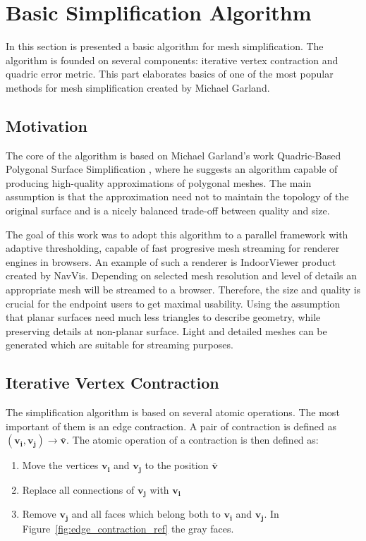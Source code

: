 \chapter{Basic Simplification Algorithm}
\thispagestyle{empty}%
In this section is presented a basic algorithm for mesh simplification. The algorithm is founded on several components: iterative vertex contraction and quadric error metric. This part elaborates basics of one of the most popular methods for mesh simplification created by Michael Garland.
\section{Motivation}
The core of the algorithm is based on Michael Garland's work Quadric-Based Polygonal Surface Simplification \cite{garland99}, where he suggests an algorithm capable of producing high-quality approximations of polygonal meshes. The main assumption is that the approximation need not to maintain the topology of the original surface and is a nicely balanced trade-off between quality and size.

The goal of this work was to adopt this algorithm to a parallel framework with adaptive thresholding, capable of fast progresive mesh streaming \cite{yang01} for renderer engines in browsers. An example of such a renderer is IndoorViewer product created by NavVis. Depending on selected mesh resolution and level of details an appropriate mesh will be streamed to a browser. Therefore, the size and quality is crucial for the endpoint users to get maximal usability. Using the assumption that planar surfaces need much less triangles to describe geometry, while preserving details at non-planar surface. Light and detailed meshes can be generated which are suitable for streaming purposes.
\clearpage

\section{Iterative Vertex Contraction}
The simplification algorithm is based on several atomic operations. The most important of them is an edge contraction. A pair of contraction is defined as $(\mathbf{v_i}, \mathbf{v_j})\rightarrow\bar{\mathbf{v}}$. The atomic operation of a contraction is then defined as:

\begin{enumerate}
\item Move the vertices $\mathbf{v_i}$ and $\mathbf{v_j}$ to the position $\bar{\mathbf{v}}$
\item Replace all connections of $\mathbf{v_j}$ with $\mathbf{v_i}$
\item Remove $\mathbf{v_j}$ and all faces which belong both to $\mathbf{v_i}$ and $\mathbf{v_j}$. In Figure~\ref{fig:edge_contraction_ref} the gray faces.
\end{enumerate}

